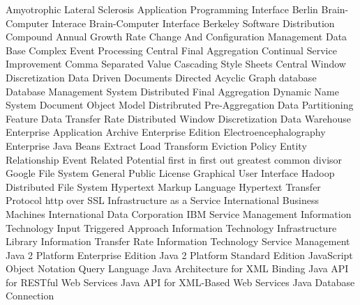 \begin{acronym}[YTM]
	{Amyotrophic Lateral Sclerosis}
	{Application Programming Interface}
	{Berlin Brain-Computer Interace}
	{Brain-Computer Interface}
  {Berkeley Software Distribution}
 {Compound Annual Growth Rate}
 {Change And Configuration Management Data Base}
  {Complex Event Processing}
  {Central Final Aggregation}
  {Continual Service Improvement}
	{Comma Separated Value}
  {Cascading Style Sheets}
  {Central Window Discretization}
   {Data Driven Documents}
  {Directed Acyclic Graph}
	{database}
 {Database Management System}
  {Distributed Final Aggregation}
	{Dynamic Name System}
  {Document Object Model}
  {Distribruted Pre­-Aggregation}
	{Data Partitioning Feature}
	{Data Transfer Rate}
  {Distributed Window Discretization}
	{Data Warehouse}
  {Enterprise Application Archive}
   {Enterprise Edition}
	{Electroencephalography}
  {Enterprise Java Beans}
	{Extract Load Transform}
   {Eviction Policy}
   {Entity Relationship}
	{Event Related Potential}
 {first in first out}
  {greatest common divisor}
  {Google File System}
  {General Public License}
  {Graphical User Interface}
	{Hadoop Distributed File System}
 {Hypertext Markup Language} 
 {Hypertext Transfer Protocol}
 {http over SSL}
 {Infrastructure as a Service}
	{International Business Machines}
	{International Data Corporation}
  {IBM Service Management}
   {Information Technology}
  {Input Triggered Approach}
 {Information Technology Infrastructure Library}
	{Information Transfer Rate}
 {Information Technology Service Management}
 {Java 2 Platform Enterprise Edition}
 {Java 2 Platform Standard Edition}
 {JavaScript Object Notation Query Language}
 {Java Architecture for XML Binding}
 {Java API for RESTful Web Services}
 {Java API for XML-Based Web Services}
 {Java Database Connection}

\end{acronym}
